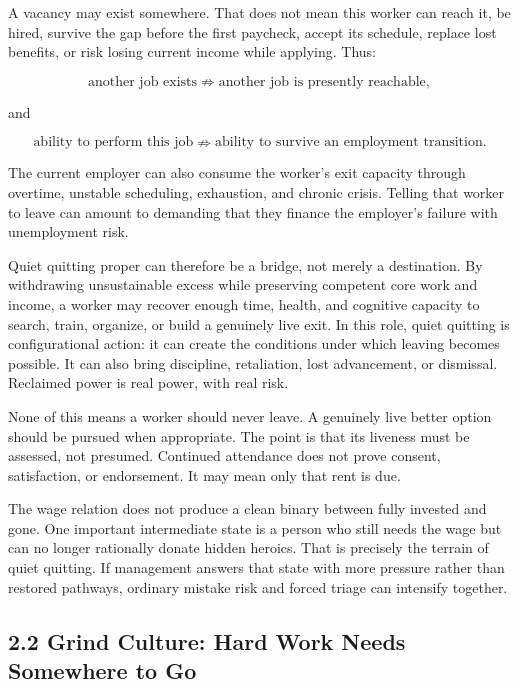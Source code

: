 \documentclass[11pt,oneside]{article}
\begin{document}
A vacancy may exist somewhere. That does not mean this worker can reach
it, be hired, survive the gap before the first paycheck, accept its
schedule, replace lost benefits, or risk losing current income while
applying. Thus:

\[
\text{another job exists}
\nRightarrow
\text{another job is presently reachable},
\]

and

\[
\text{ability to perform this job}
\nRightarrow
\text{ability to survive an employment transition}.
\]

The current employer can also consume the worker's exit capacity through
overtime, unstable scheduling, exhaustion, and chronic crisis. Telling
that worker to leave can amount to demanding that they finance the
employer's failure with unemployment risk.

Quiet quitting proper can therefore be a bridge, not merely a
destination. By withdrawing unsustainable excess while preserving
competent core work and income, a worker may recover enough time,
health, and cognitive capacity to search, train, organize, or build a
genuinely live exit. In this role, quiet quitting is configurational
action: it can create the conditions under which leaving becomes
possible. It can also bring discipline, retaliation, lost advancement,
or dismissal. Reclaimed power is real power, with real risk.

None of this means a worker should never leave. A genuinely live better
option should be pursued when appropriate. The point is that its
liveness must be assessed, not presumed. Continued attendance does not
prove consent, satisfaction, or endorsement. It may mean only that rent
is due.

The wage relation does not produce a clean binary between fully invested
and gone. One important intermediate state is a person who still needs
the wage but can no longer rationally donate hidden heroics. That is
precisely the terrain of quiet quitting. If management answers that
state with more pressure rather than restored pathways, ordinary mistake
risk and forced triage can intensify together.

\hypertarget{grind-culture-hard-work-needs-somewhere-to-go}{%
\subsection{2.2 Grind Culture: Hard Work Needs Somewhere to
Go}\label{grind-culture-hard-work-needs-somewhere-to-go}}
\end{document}
